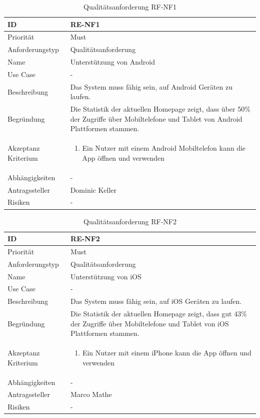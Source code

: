 \begin{table}[ht]
\centering
  \begin{tabular}{ l | p{8cm} }
	\hline
	\rowcolor{gray}
	ID 			&	\textbf{RE-NF1}\\ \hline
	Priorität 		&	Must\\ \hline
	Anforderungstyp	&	Qualitätsanforderung\\ \hline
	Name 			&	Unterstützung von Android\\ \hline
	Use Case 		&	-\\ \hline
	Beschreibung 	&	Das System muss fähig sein, auf Android Geräten zu laufen.\\ \hline
	Begründung 		&	Die Statistik der aktuellen Homepage zeigt, dass über 50\% der Zugriffe über Mobiltelefone und Tablet von Android Plattformen stammen.\\ \hline
	Akzeptanz Kriterium	&	\begin{enumerate}
					\item Ein Nutzer mit einem Android Mobiltelefon kann die App öffnen und verwenden
					\end{enumerate}
					\\ \hline
	Abhängigkeiten 	&	-\\ \hline
	Antragssteller 	&	Dominic Keller\\ \hline
	Risiken	 	&	-
  \end{tabular}
   \caption{Qualitätsanforderung RF-NF1}\label{table:req_nf_1}
\end{table}

\begin{table}[ht]
\centering
  \begin{tabular}{ l | p{8cm} }
	\hline
	\rowcolor{gray}
	ID 			&	\textbf{RE-NF2}\\ \hline
	Priorität 		&	Must\\ \hline
	Anforderungstyp	&	Qualitätsanforderung\\ \hline
	Name 			&	Unterstützung von iOS\\ \hline
	Use Case 		&	-\\ \hline
	Beschreibung 	&	Das System muss fähig sein, auf iOS Geräten zu laufen.\\ \hline
	Begründung 		&	Die Statistik der aktuellen Homepage zeigt, dass gut 43\% der Zugriffe über Mobiltelefone und Tablet von iOS Plattformen stammen.\\ \hline
	Akzeptanz Kriterium	&	\begin{enumerate}
					\item Ein Nutzer mit einem iPhone kann die App öffnen und verwenden
					\end{enumerate}
					\\ \hline
	Abhängigkeiten 	&	-\\ \hline
	Antragssteller 	&	Marco Mathe\\ \hline
	Risiken	 	&	-
  \end{tabular}
   \caption{Qualitätsanforderung RF-NF2}\label{table:req_nf_2}
\end{table}


